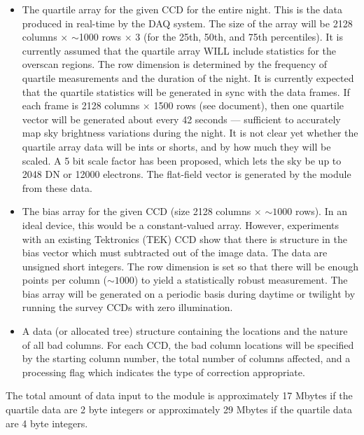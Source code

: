 \begin{itemize}

\item The quartile array for the given CCD for the entire night.
This is the data produced in real-time by the DAQ system. The size
of the array will be 2128 columns $\times$ $\sim$1000 rows $\times$ 3
(for the 25th, 50th, and 75th percentiles). 
It is currently assumed that the quartile array WILL
include statistics for the overscan regions. 
The row dimension is determined by the frequency of quartile measurements
and the duration of the night. It is currently expected that the
quartile statistics will be generated in sync with the data frames. If
each frame is 2128 columns $\times$ 1500 rows (see \cfrm document), then
one quartile vector will be generated about every 42 seconds --- sufficient
to accurately map sky brightness variations during the night.
It is not clear yet whether the quartile array data
will be ints or shorts, and by how much they will be scaled. A 5 bit scale
factor has been proposed, which lets the sky be up to 2048 DN or
12000 electrons. The flat-field vector is generated by the 
\icfrm module from these data.

\item The bias array for the given CCD 
(size 2128 columns $\times$ $\sim1000$ rows).
In an ideal device, this would be a constant-valued array.
However, experiments with an existing Tektronics (TEK) CCD show that there
is structure in the bias vector which must subtracted out of the
image data. The data are unsigned short integers. 
The row dimension is set so that there will be enough points
per column ($\sim1000$) to yield a statistically robust measurement.
The bias array will be generated on a periodic basis during daytime
or twilight by running the survey CCDs with zero illumination. 

\item A data (or allocated tree) structure
containing the locations and the nature
of all bad columns. For each CCD, the bad column locations will be
specified by the starting column number, the total number of columns
affected, and a processing flag which indicates the type of correction
appropriate.

\end{itemize}

The total amount of data input to the \icfrm module is approximately
17 Mbytes if the quartile data are 2 byte integers or 
approximately 29 Mbytes if the quartile data are 4 byte integers. 

